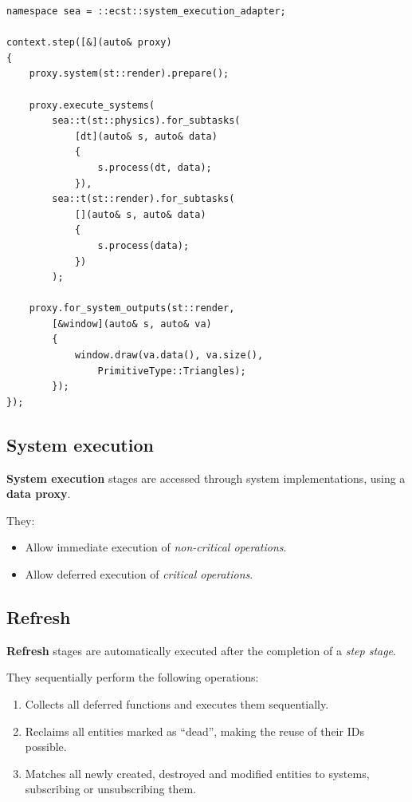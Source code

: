 \documentclass[twoside, 12pt, a4paper, openany]{book}
\begin{document}
\begin{verbatim}
namespace sea = ::ecst::system_execution_adapter;

context.step([&](auto& proxy)
{
    proxy.system(st::render).prepare();

    proxy.execute_systems(
        sea::t(st::physics).for_subtasks(
            [dt](auto& s, auto& data)
            {
                s.process(dt, data);
            }),
        sea::t(st::render).for_subtasks(
            [](auto& s, auto& data)
            {
                s.process(data);
            })
        );

    proxy.for_system_outputs(st::render,
        [&window](auto& s, auto& va)
        {
            window.draw(va.data(), va.size(),
                PrimitiveType::Triangles);
        });
});
\end{verbatim}

\subsection{System execution}\label{system-execution}

\textbf{System execution} stages are accessed through system
implementations, using a \textbf{data proxy}.

They:

\begin{itemize}
\item
  Allow immediate execution of \emph{non-critical operations}.
\item
  Allow deferred execution of \emph{critical operations}.
\end{itemize}

\hypertarget{flow_refresh}{\subsection{Refresh}\label{flow_refresh}}

\textbf{Refresh} stages are automatically executed after the completion
of a \emph{step stage}.

They sequentially perform the following operations:

\begin{enumerate}
\def\labelenumi{\arabic{enumi}.}
\item
  Collects all deferred functions and executes them sequentially.
\item
  Reclaims all entities marked as ``dead'', making the reuse of their
  IDs possible.
\item
  Matches all newly created, destroyed and modified entities to systems,
  subscribing or unsubscribing them.
\end{enumerate}
\end{document}

